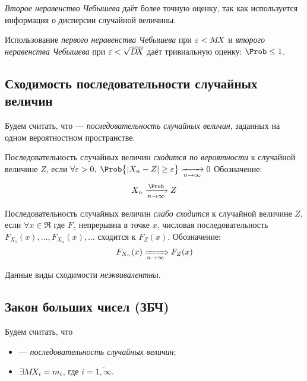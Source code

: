\begin{rem}
	\emph{Второе неравенство Чебышева} даёт более точную оценку, так как используется информация о дисперсии случайной величины.
\end{rem}

\begin{rem}
	Использование \emph{первого неравенства Чебышева} при $\varepsilon < M\!X$ и \emph{второго неравенства Чебышева} при $\varepsilon < \sqrt{D\!X}$ даёт тривиальную оценку: $\Prob \leq 1$.
\end{rem}


\subsection{Сходимость последовательности случайных величин}

Будем считать, что \infseqX --- \emph{последовательность случайных величин}, заданных на одном вероятностном пространстве.

\begin{defn}
	Последовательность случайных величин \infseqX \emph{сходится по вероятности} к случайной величине $Z$, если $\forall\varepsilon>0,\;\Prob\bigl\{ |X_n - Z| \geq\varepsilon\bigr \}\xrightarrow[n\to\infty]{}0$ Обозначение:
	\[
		X_n\xrightarrow[n\to\infty]{\Prob}Z
	\]
\end{defn}

\begin{defn}
	Последовательность случайных величин \infseqX \emph{слабо сходится} к случайной величине $Z$, если $\forall x\in\Re$ где $F_z$ непрерывна в точке $x$, числовая последовательность $F_{X_1}(x), \dots, F_{X_n}(x), \dots$ сходится к $F_Z(x)$. Обозначение:
	\[
		F_{X_n}(x) \xRightarrow[n\to\infty]{} F_Z(x)
	\]
\end{defn}

\begin{rem}
	Данные виды сходимости \emph{неэквивалентны}.
\end{rem}


\subsection{Закон больших чисел (ЗБЧ)}

Будем считать, что 
\begin{itemize}
	\item \infseqX --- \emph{последовательность случайных величин};
	\item $\exists M\!X_i = m_i$, где $i = \overline{1, \infty}$.
\end{itemize}

